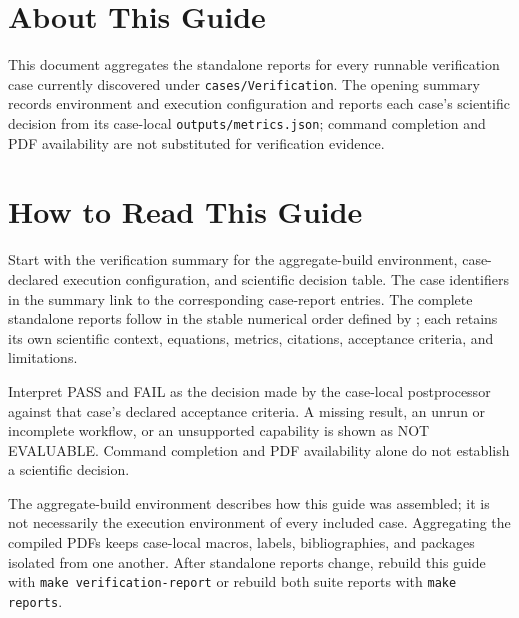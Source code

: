 \documentclass[12pt]{article}
\begin{document}
\newcommand{\GuideTitle}{ELMFIRE Verification Guide}



\section*{About This Guide}
{}
This document aggregates the standalone reports for every runnable verification
case currently discovered under \texttt{cases/Verification}.  The opening
summary records environment and execution configuration and reports each case's
scientific decision from its case-local \texttt{outputs/metrics.json}; command
completion and PDF availability are not substituted for verification evidence.

\clearpage
\tableofcontents
\clearpage

\section{How to Read This Guide}

Start with the verification summary for the aggregate-build environment,
case-declared execution configuration, and scientific decision table.  The
case identifiers in the summary link to the corresponding case-report entries.
The complete standalone reports follow in the stable numerical order defined
by ; each retains its own scientific
context, equations, metrics, citations, acceptance criteria, and limitations.

Interpret PASS and FAIL as the decision made by the case-local postprocessor
against that case's declared acceptance criteria.  A missing result, an unrun
or incomplete workflow, or an unsupported capability is shown as NOT
EVALUABLE.  Command completion and PDF availability alone do not establish a
scientific decision.

The aggregate-build environment describes how this guide was assembled; it is
not necessarily the execution environment of every included case.  Aggregating
the compiled PDFs keeps case-local macros, labels, bibliographies, and packages
isolated from one another.  After standalone reports change, rebuild this guide
with \texttt{make verification-report} or rebuild both suite reports with
\texttt{make reports}.




\end{document}
